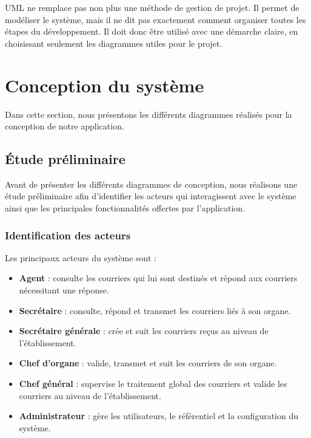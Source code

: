UML ne remplace pas non plus une méthode de gestion de projet. Il permet de modéliser le système, mais il ne dit pas exactement comment organiser toutes les étapes du développement. Il doit donc être utilisé avec une démarche claire, en choisissant seulement les diagrammes utiles pour le projet.

\section{Conception du système}
\label{sec:conception_systeme}

Dans cette section, nous présentons les différents diagrammes réalisés pour la conception de notre application.

\subsection{Étude préliminaire}
\label{subsec:etude_preliminaire}

Avant de présenter les différents diagrammes de conception, nous réalisons une étude préliminaire afin d’identifier les acteurs qui interagissent avec le système ainsi que les principales fonctionnalités offertes par l’application.

\subsubsection{Identification des acteurs}
\label{subsubsec:identification_acteurs}

Les principaux acteurs du système sont :

\begin{itemize}
    \item \textbf{Agent} : consulte les courriers qui lui sont destinés et répond aux courriers nécessitant une réponse.
    \item \textbf{Secrétaire} : consulte, répond et transmet les courriers liés à son organe.
    \item \textbf{Secrétaire générale} : crée et suit les courriers reçus au niveau de l’établissement.
    \item \textbf{Chef d’organe} : valide, transmet et suit les courriers de son organe.
    \item \textbf{Chef général} : supervise le traitement global des courriers et valide les courriers au niveau de l’établissement.
    \item \textbf{Administrateur} : gère les utilisateurs, le référentiel et la configuration du système.
\end{itemize}

